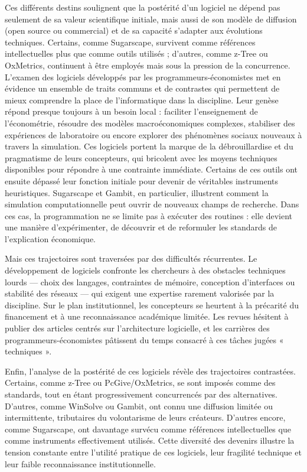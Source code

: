 Ces différents destins soulignent que la postérité d’un logiciel ne dépend pas seulement de sa valeur scientifique initiale, mais aussi de son modèle de diffusion (open source ou commercial) et de sa capacité s’adapter aux évolutions techniques. Certains, comme Sugarscape, survivent comme références intellectuelles plus que comme outils utilisés ; d’autres, comme z-Tree ou OxMetrics, continuent à être employés mais sous la pression de la concurrence.\\





L’examen des logiciels développés par les programmeurs-économistes met en évidence un ensemble de traits communs et de contrastes qui permettent de mieux comprendre la place de l’informatique dans la discipline. Leur genèse répond presque toujours à un besoin local : faciliter l’enseignement de l’économétrie, résoudre des modèles macroéconomiques complexes, stabiliser des expériences de laboratoire ou encore explorer des phénomènes sociaux nouveaux à travers la simulation. Ces logiciels portent la marque de la débrouillardise et du pragmatisme de leurs concepteurs, qui bricolent avec les moyens techniques disponibles pour répondre à une contrainte immédiate.
Certains de ces outils ont ensuite dépassé leur fonction initiale pour devenir de véritables instruments heuristiques. Sugarscape et Gambit, en particulier, illustrent comment la simulation computationnelle peut ouvrir de nouveaux champs de recherche. Dans ces cas, la programmation ne se limite pas à exécuter des routines : elle devient une manière d’expérimenter, de découvrir et de reformuler les standards de l’explication économique.

Mais ces trajectoires sont traversées par des difficultés récurrentes. Le développement de logiciels confronte les chercheurs à des obstacles techniques lourds — choix des langages, contraintes de mémoire, conception d’interfaces ou stabilité des réseaux — qui exigent une expertise rarement valorisée par la discipline. Sur le plan institutionnel, les concepteurs se heurtent à la précarité du financement et à une reconnaissance académique limitée. Les revues hésitent à publier des articles centrés sur l’architecture logicielle, et les carrières des programmeurs-économistes pâtissent du temps consacré à ces tâches jugées « techniques ».

Enfin, l’analyse de la postérité de ces logiciels révèle des trajectoires contrastées. Certains, comme z-Tree ou PcGive/OxMetrics, se sont imposés comme des standards, tout en étant progressivement concurrencés par des alternatives. D’autres, comme WinSolve ou Gambit, ont connu une diffusion limitée ou intermittente, tributaires du volontarisme de leurs créateurs. D’autres encore, comme Sugarscape, ont davantage survécu comme références intellectuelles que comme instruments effectivement utilisés. Cette diversité des devenirs illustre la tension constante entre l’utilité pratique de ces logiciels, leur fragilité technique et leur faible reconnaissance institutionnelle.\\




